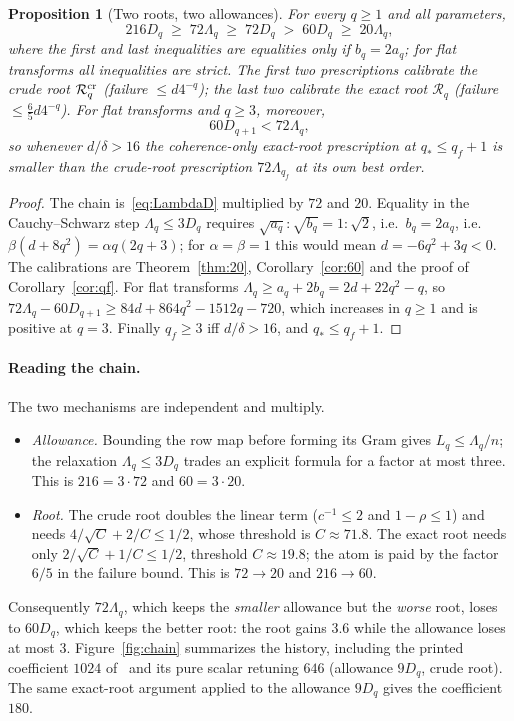 \documentclass[11pt,a4paper]{article}
\newtheorem{proposition}[theorem]{Proposition}
\theoremstyle{definition}
\theoremstyle{remark}
\numberwithin{equation}{section}
\newcommand{\Rex}{\mathcal R}
\begin{document}
\begin{proposition}[Two roots, two allowances]\label{prop:chain}
For every $q\ge1$ and all parameters,
\begin{equation}\label{eq:chain}
 216D_q\;\ge\;72\Lambda_q\;\ge\;72D_q\;>\;60D_q\;\ge\;20\Lambda_q ,
\end{equation}
where the first and last inequalities are equalities only if $b_q=2a_q$;
for flat transforms all inequalities are strict. The first two prescriptions
calibrate the crude root $\Rex^{\rm cr}_q$ (failure $\le d4^{-q}$); the last
two calibrate the exact root $\Rex_q$ (failure $\le\frac65d4^{-q}$). For
flat transforms and $q\ge3$, moreover,
\begin{equation}\label{eq:flatcross}
 60D_{q+1}<72\Lambda_q ,
\end{equation}
so whenever $d/\delta>16$ the coherence-only exact-root prescription at
$q_*\le q_f+1$ is smaller than the crude-root prescription $72\Lambda_{q_f}$ at
its own best order.
\end{proposition}
\begin{proof}
The chain is~\eqref{eq:LambdaD} multiplied by $72$ and $20$. Equality in the
Cauchy--Schwarz step $\Lambda_q\le3D_q$ requires $\sqrt{a_q}:\sqrt{b_q}=1:\sqrt2$,
i.e.\ $b_q=2a_q$, i.e.\ $\beta(d+8q^2)=\alpha q(2q+3)$; for $\alpha=\beta=1$
this would mean $d=-6q^2+3q<0$. The calibrations are Theorem~\ref{thm:20},
Corollary~\ref{cor:60} and the proof of Corollary~\ref{cor:qf}. For flat
transforms $\Lambda_q\ge a_q+2b_q=2d+22q^2-q$, so
$72\Lambda_q-60D_{q+1}\ge84d+864q^2-1512q-720$, which increases in $q\ge1$
and is positive at $q=3$. Finally $q_f\ge3$ iff $d/\delta>16$, and
$q_*\le q_f+1$.
\end{proof}

\paragraph{Reading the chain.}
The two mechanisms are independent and multiply.
\begin{itemize}
\item \emph{Allowance.} Bounding the row map before forming its Gram gives
$L_q\le\Lambda_q/n$; the relaxation $\Lambda_q\le3D_q$ trades an explicit
formula for a factor at most three. This is $216=3\cdot72$ and $60=3\cdot20$.
\item \emph{Root.} The crude root doubles the linear term ($c^{-1}\le2$ and
$1-\rho\le1$) and needs $4/\sqrt C+2/C\le1/2$, whose threshold is
$C\approx71.8$. The exact root needs only $2/\sqrt C+1/C\le1/2$, threshold
$C\approx19.8$; the atom is paid by the factor $6/5$ in the failure bound.
This is $72\to20$ and $216\to60$.
\end{itemize}
Consequently $72\Lambda_q$, which keeps the \emph{smaller} allowance but the
\emph{worse} root, loses to $60D_q$, which keeps the better root: the root
gains $3.6$ while the allowance loses at most $3$. Figure~\ref{fig:chain}
summarizes the history, including the printed coefficient $1024$ of~\cite{V11}
and its pure scalar retuning $646$ (allowance $9D_q$, crude root). The same
exact-root argument applied to the allowance $9D_q$ gives the coefficient $180$.
\end{document}
